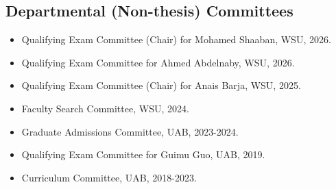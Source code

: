 \documentclass[line]{res}
\begin{document}
\begin{resume}
\section{\large Departmental (Non-thesis) Committees} \vspace{0.45cm}
\begin{itemize}
  \item Qualifying Exam Committee (Chair) for Mohamed Shaaban, WSU, 2026.
  \item Qualifying Exam Committee for Ahmed Abdelnaby, WSU, 2026.
  \item Qualifying Exam Committee (Chair) for Anais Barja, WSU, 2025.
  \item Faculty Search Committee, WSU, 2024.
  \item Graduate Admissions Committee, UAB, 2023-2024.
  \item Qualifying Exam Committee for Guimu Guo, UAB, 2019.
  \item Curriculum Committee, UAB, 2018-2023.
\end{itemize}


\end{resume}
\end{document}

